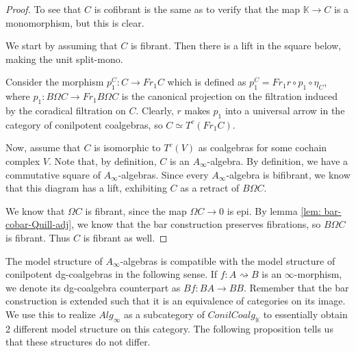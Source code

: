 \documentclass[../thesis.tex]{subfiles}
\begin{document}
        \begin{proof}
            To see that $C$ is cofibrant is the same as to verify that the map $\mathbb{K}\rightarrow C$ is a monomorphism, but this is clear.

            We start by assuming that $C$ is fibrant. Then there is a lift in the square below, making the unit split-mono.
            \begin{center}
            \end{center}
            Consider the morphism $p_1^C : C \rightarrow Fr_1C$ which is defined as $p_1^C = Fr_1r\circ p_1\circ \eta_C$, where $p_1 : B\Omega C \rightarrow Fr_1 B\Omega C$ is the canonical projection on the filtration induced by the coradical filtration on $C$. Clearly, $r$ makes $p_1$ into a universal arrow in the category of conilpotent coalgebras, so $C \simeq T^c(Fr_1C)$.

            Now, assume that $C$ is isomorphic to $T^c(V)$ as coalgebras for some cochain complex $V$. Note that, by definition, $C$ is an $A_\infty$-algebra. By definition, we have a commutative square of $A_\infty$-algebras. Since every $A_\infty$-algebra is bifibrant, we know that this diagram has a lift, exhibiting $C$ as a retract of $B\Omega C$.
            \begin{center}
            \end{center}

            We know that $\Omega C$ is fibrant, since the map $\Omega C \rightarrow 0$ is epi. By lemma \ref{lem: bar-cobar-Quill-adj}, we know that the bar construction preserves fibrations, so $B\Omega C$ is fibrant. Thus $C$ is fibrant as well.
        \end{proof}

        The model structure of $A_\infty$-algebras is compatible with the model structure of conilpotent dg-coalgebras in the following sense. If $f : A \rightsquigarrow B$ is an $\infty$-morphism, we denote its dg-coalgebra counterpart as $Bf : BA \rightarrow BB$. Remember that the bar construction is extended such that it is an equivalence of categories on its image. We use this to realize $Alg_\infty$ as a subcategory of $ConilCoalg_\mathbb{K}$ to essentially obtain 2 different model structure on this category. The following proposition tells us that these structures do not differ.
\end{document}
